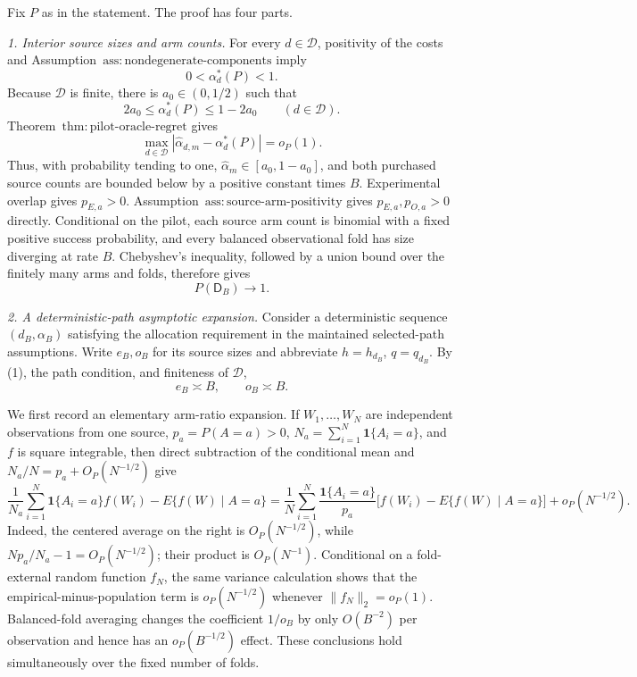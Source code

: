 Fix \(P\) as in the statement.  The proof has four parts.

\emph{1. Interior source sizes and arm counts.}
For every \(d\in\mathcal D\), positivity of the costs and Assumption~\(\mathrm{ass{:}nondegenerate\text{-}components}\) imply
\[
 0<\alpha_d^*(P)<1.
\]
Because \(\mathcal D\) is finite, there is \(a_0\in(0,1/2)\) such that
\[
 2a_0\le \alpha_d^*(P)\le1-2a_0
 \qquad(d\in\mathcal D). \tag{1}
\]
Theorem~\(\mathrm{thm{:}pilot\text{-}oracle\text{-}regret}\) gives
\[
 \max_{d\in\mathcal D}
 |\widehat\alpha_{d,m}-\alpha_d^*(P)|=o_P(1). \tag{2}
\]
Thus, with probability tending to one, \(\widehat\alpha_m\in[a_0,1-a_0]\), and both purchased source counts are bounded below by a positive constant times \(B\).  Experimental overlap gives \(p_{E,a}>0\).  Assumption~\(\mathrm{ass{:}source\text{-}arm\text{-}positivity}\) gives \(p_{E,a},p_{O,a}>0\) directly.  Conditional on the pilot, each source arm count is binomial with a fixed positive success probability, and every balanced observational fold has size diverging at rate \(B\).  Chebyshev's inequality, followed by a union bound over the finitely many arms and folds, therefore gives
\[
 P(\mathsf D_B)\longrightarrow1. \tag{3}
\]

\emph{2. A deterministic-path asymptotic expansion.}
Consider a deterministic sequence \((d_B,\alpha_B)\) satisfying the allocation requirement in the maintained selected-path assumptions.  Write \(e_B,o_B\) for its source sizes and abbreviate \(h=h_{d_B}\), \(q=q_{d_B}\).  By (1), the path condition, and finiteness of \(\mathcal D\),
\[
 e_B\asymp B,\qquad o_B\asymp B. \tag{4}
\]

We first record an elementary arm-ratio expansion.  If \(W_1,\ldots,W_N\) are independent observations from one source, \(p_a=P(A=a)>0\), \(N_a=\sum_{i=1}^N\mathbf 1\{A_i=a\}\), and \(f\) is square integrable, then direct subtraction of the conditional mean and \(N_a/N=p_a+O_P(N^{-1/2})\) give
\[
 \frac{1}{N_a}\sum_{i=1}^N\mathbf 1\{A_i=a\}f(W_i)
 -E\{f(W)\mid A=a\}
 =\frac1N\sum_{i=1}^N\frac{\mathbf 1\{A_i=a\}}{p_a}
 \bigl[f(W_i)-E\{f(W)\mid A=a\}\bigr]
 +o_P(N^{-1/2}). \tag{5}
\]
Indeed, the centered average on the right is \(O_P(N^{-1/2})\), while \(Np_a/N_a-1=O_P(N^{-1/2})\); their product is \(O_P(N^{-1})\).  Conditional on a fold-external random function \(f_N\), the same variance calculation shows that the empirical-minus-population term is \(o_P(N^{-1/2})\) whenever \(\|f_N\|_2=o_P(1)\).  Balanced-fold averaging changes the coefficient \(1/o_B\) by only \(O(B^{-2})\) per observation and hence has an \(o_P(B^{-1/2})\) effect.  These conclusions hold simultaneously over the fixed number of folds.


